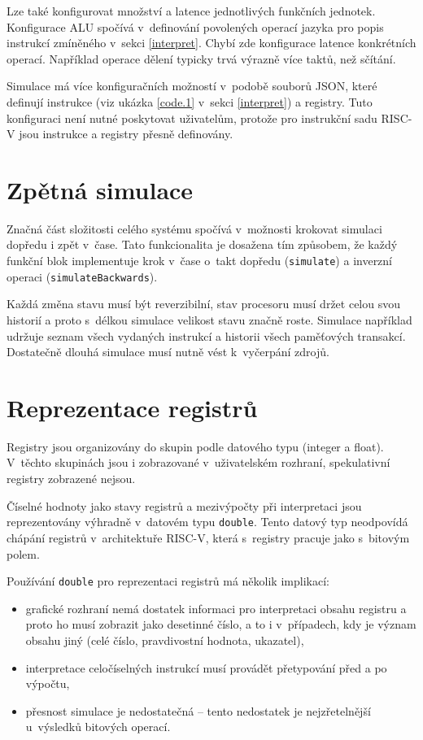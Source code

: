 Lze také konfigurovat množství a latence jednotlivých funkčních jednotek.
Konfigurace ALU spočívá v~definování povolených operací jazyka pro popis instrukcí zmíněného v~sekci \ref{interpret}.
Chybí zde konfigurace latence konkrétních operací.
Například operace dělení typicky trvá výrazně více taktů, než sčítání.

Simulace má více konfiguračních možností v~podobě souborů JSON, které definují instrukce (viz ukázka \ref{code.1} v~sekci \ref{interpret}) a registry.
Tuto konfiguraci není nutné poskytovat uživatelům, protože pro instrukční sadu RISC-V jsou instrukce a registry přesně definovány. 

\section{Zpětná simulace}

Značná část složitosti celého systému spočívá v~možnosti krokovat simulaci dopředu i zpět v~čase.
Tato funkcionalita je dosažena tím způsobem, že každý funkční blok implementuje krok v~čase o~takt dopředu (\texttt{simulate}) a inverzní operaci (\texttt{simulateBackwards}).

Každá změna stavu musí být reverzibilní, stav procesoru musí držet celou svou historií a proto  s~délkou simulace velikost stavu značně roste.
Simulace například udržuje seznam všech vydaných instrukcí a historii všech paměťových transakcí.
Dostatečně dlouhá simulace musí nutně vést k~vyčerpání zdrojů.

\section{Reprezentace registrů}
\label{repr_reg}

Registry jsou organizovány do skupin podle datového typu (integer a float).
V~těchto skupinách jsou i zobrazované v~uživatelském rozhraní, spekulativní registry zobrazené nejsou.

Číselné hodnoty jako stavy registrů a mezivýpočty při interpretaci jsou reprezentovány výhradně v~datovém typu \texttt{double}.
Tento datový typ neodpovídá chápání registrů v~architektuře RISC-V, která s~registry pracuje jako s~bitovým polem.

Používání \texttt{double} pro reprezentaci registrů má několik implikací:
\begin{itemize}
    \item grafické rozhraní nemá dostatek informaci pro interpretaci obsahu registru a proto ho musí zobrazit jako desetinné číslo, a to i v~případech, kdy je význam obsahu jiný (celé číslo, pravdivostní hodnota, ukazatel),
    \item interpretace celočíselných instrukcí musí provádět přetypování před a po výpočtu,
    \item přesnost simulace je nedostatečná -- tento nedostatek je nejzřetelnější u~výsledků bitových operací.
\end{itemize}

